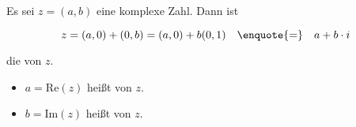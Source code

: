 Es sei $z = (a, b)$ eine komplexe Zahl. Dann ist

$$z = (a, 0) + (0, b) = (a, 0) + b(0, 1) \quad \text{\enquote{=}} \quad a + b \cdot i$$

die  von $z$.

\begin{itemize}
    \item $a = \text{Re}(z)$ heißt  von $z$.
    \item $b = \text{Im}(z)$ heißt  von $z$.
\end{itemize}